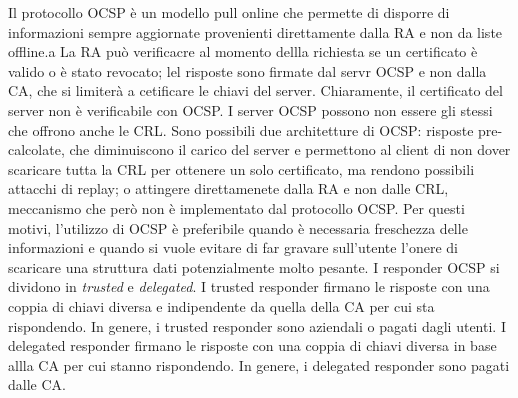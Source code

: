 \documentclass[answers, a4paper, 11pt]{exam}
\begin{document}
\begin{questions}
\begin{parts}
\begin{solution}
	Il protocollo OCSP è un modello pull online che permette di disporre di informazioni sempre aggiornate provenienti direttamente dalla RA e non da liste offline.a
	La RA può verificacre al momento dellla richiesta se un certificato è valido o è stato revocato; lel risposte sono firmate dal servr OCSP e non dalla CA, che si limiterà a cetificare le chiavi del server.
	Chiaramente, il certificato del server non è verificabile con OCSP.
	I server OCSP possono non essere gli stessi che offrono anche le CRL.
	Sono possibili due architetture di OCSP: risposte pre-calcolate, che diminuiscono il carico del server e permettono al client di non dover scaricare tutta la CRL per ottenere un solo certificato, ma rendono possibili attacchi di replay; o attingere direttamenete dalla RA e non dalle CRL, meccanismo che però non è implementato dal protocollo OCSP.
Per questi motivi, l'utilizzo di OCSP è preferibile quando è necessaria freschezza delle informazioni e quando si vuole evitare di far gravare sull'utente l'onere di scaricare una struttura dati potenzialmente molto pesante.
	I responder OCSP si dividono in \textit{trusted} e \textit{delegated}.
	I trusted responder  firmano le risposte con una coppia di chiavi diversa e indipendente da quella della CA per cui sta rispondendo.
	In genere, i trusted responder sono aziendali o pagati dagli utenti.
	I delegated responder firmano  le risposte con una coppia di chiavi diversa in base allla CA per cui stanno rispondendo.
	In genere, i delegated responder sono pagati dalle CA.
\end{solution}

\end{parts}
\end{questions}
\end{document}
